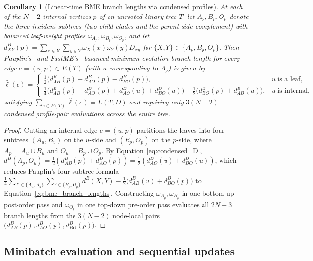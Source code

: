 \documentclass[11pt,a4paper]{article}
\makeatletter
\DeclareRobustCommand{\_}{\ifmmode\nfss@text{\textunderscore}\else\textunderscore\allowbreak\fi}
\newtheorem{corollary}[theorem]{Corollary}
\theoremstyle{definition}
\makeatother
\begin{document}
\begin{corollary}[Linear-time BME branch lengths via condensed profiles]
\label{cor:branch_lengths}
At each of the $N-2$ internal vertices $p$ of an unrooted binary tree $T$, let $A_p,B_p,O_p$ denote the three incident subtrees (two child clades and the parent-side complement) with balanced leaf-weight profiles $\omega_{A_p},\omega_{B_p},\omega_{O_p}$, and let $d^B_{XY}(p)=\sum_{x\in X}\sum_{y\in Y}\omega_X(x)\omega_Y(y)D_{xy}$ for $\{X,Y\}\subset\{A_p,B_p,O_p\}$.
Then Pauplin's~\cite{pauplin2000direct} and FastME's~\cite{desper2002fast} balanced minimum-evolution branch length for every edge $e=(u,p)\in E(T)$ (with $u$ corresponding to $A_p$) is given by
\begin{equation}
 \hat\ell(e)=
 \begin{cases}
  \tfrac12\bigl(d^B_{AB}(p)+d^B_{AO}(p)-d^B_{BO}(p)\bigr), & u\text{ is a leaf},\\[4pt]
  \tfrac14\bigl(d^B_{AB}(p)+d^B_{AO}(p)+d^B_{AO}(u)+d^B_{BO}(u)\bigr)
  -\tfrac12\bigl(d^B_{BO}(p)+d^B_{AB}(u)\bigr), & u\text{ is internal},
 \end{cases}
 \label{eq:bme_branch_lengths}
\end{equation}
satisfying $\sum_{e\in E(T)}\hat\ell(e)=L(T;D)$ and requiring only $3(N-2)$ condensed profile-pair evaluations across the entire tree.
\end{corollary}
\begin{proof}
Cutting an internal edge $e=(u,p)$ partitions the leaves into four subtrees $(A_u,B_u)$ on the $u$-side and $(B_p,O_p)$ on the $p$-side, where $A_p=A_u\cup B_u$ and $O_u=B_p\cup O_p$.
By Equation~\eqref{eq:condensed_D}, $d^B(A_p,O_u)=\tfrac12(d^B_{AB}(p)+d^B_{AO}(p))=\tfrac12(d^B_{AO}(u)+d^B_{BO}(u))$, which reduces Pauplin's four-subtree formula $\tfrac14\sum_{X\in\{A_u,B_u\}}\sum_{Y\in\{B_p,O_p\}}d^B(X,Y)-\tfrac12\bigl(d^B_{AB}(u)+d^B_{BO}(p)\bigr)$ to Equation~\eqref{eq:bme_branch_lengths}.
Constructing $\omega_{A_p},\omega_{B_p}$ in one bottom-up post-order pass and $\omega_{O_p}$ in one top-down pre-order pass evaluates all $2N-3$ branch lengths from the $3(N-2)$ node-local pairs $\bigl(d^B_{AB}(p),d^B_{AO}(p),d^B_{BO}(p)\bigr)$.
\end{proof}

\subsection{Minibatch evaluation and sequential updates}
\label{sec:acceptance}
\end{document}
